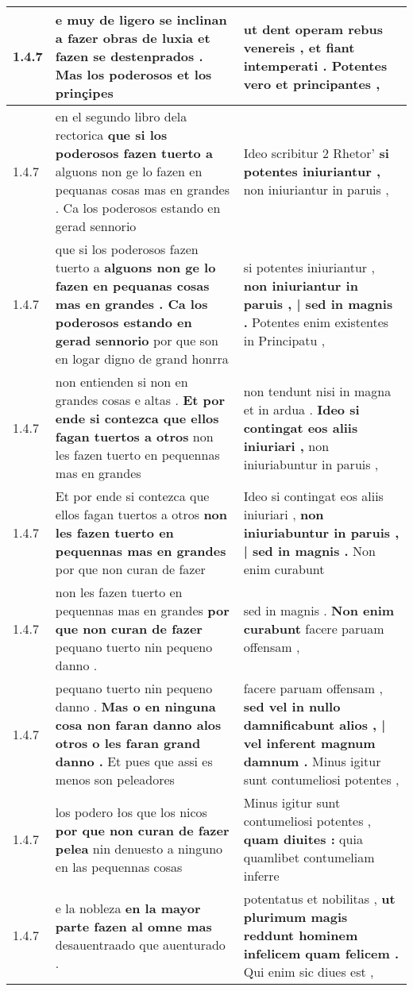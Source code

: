 \begin{tabular}{|p{1cm}|p{6.5cm}|p{6.5cm}|}
1.4.7 & e muy de ligero se inclinan a fazer obras de luxia \textbf{ et fazen se destenprados . } Mas los poderosos et los prinçipes & ut dent operam rebus venereis , \textbf{ et fiant intemperati . } Potentes vero et principantes , \\\hline
1.4.7 & en el segundo libro dela rectorica \textbf{ que si los poderosos fazen tuerto a } alguons non ge lo fazen en pequanas cosas mas en grandes . Ca los poderosos estando en gerad sennorio & Ideo scribitur 2 Rhetor’ \textbf{ si potentes iniuriantur , } non iniuriantur in paruis , \\\hline
1.4.7 & que si los poderosos fazen tuerto a \textbf{ alguons non ge lo fazen en pequanas cosas mas en grandes . Ca los poderosos estando en gerad sennorio } por que son en logar digno de grand honrra & si potentes iniuriantur , \textbf{ non iniuriantur in paruis , | sed in magnis . } Potentes enim existentes in Principatu , \\\hline
1.4.7 & non entienden si non en grandes cosas e altas . \textbf{ Et por ende si contezca que ellos fagan tuertos a otros } non les fazen tuerto en pequennas mas en grandes & non tendunt nisi in magna et in ardua . \textbf{ Ideo si contingat eos aliis iniuriari , } non iniuriabuntur in paruis , \\\hline
1.4.7 & Et por ende si contezca que ellos fagan tuertos a otros \textbf{ non les fazen tuerto en pequennas mas en grandes } por que non curan de fazer & Ideo si contingat eos aliis iniuriari , \textbf{ non iniuriabuntur in paruis , | sed in magnis . } Non enim curabunt \\\hline
1.4.7 & non les fazen tuerto en pequennas mas en grandes \textbf{ por que non curan de fazer } pequano tuerto nin pequeno danno . & sed in magnis . \textbf{ Non enim curabunt } facere paruam offensam , \\\hline
1.4.7 & pequano tuerto nin pequeno danno . \textbf{ Mas o en ninguna cosa non faran danno alos otros o les faran grand danno . } Et pues que assi es menos son peleadores & facere paruam offensam , \textbf{ sed vel in nullo damnificabunt alios , | vel inferent magnum damnum . } Minus igitur sunt contumeliosi potentes , \\\hline
1.4.7 & los podero łos que los nicos \textbf{ por que non curan de fazer pelea } nin denuesto a ninguno en las pequennas cosas & Minus igitur sunt contumeliosi potentes , \textbf{ quam diuites : } quia quamlibet contumeliam inferre \\\hline
1.4.7 & e la nobleza \textbf{ en la mayor parte fazen al omne mas } desauentraado que auenturado . & potentatus et nobilitas , \textbf{ ut plurimum magis reddunt hominem infelicem quam felicem . } Qui enim sic diues est , \\\hline

\end{tabular}
